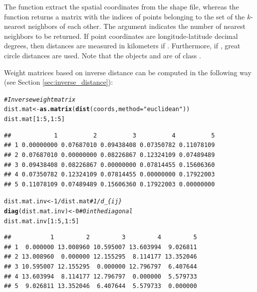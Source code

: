 \documentclass[english,12pt]{book}\usepackage[]{graphicx}\usepackage[]{xcolor}
\makeatletter
\newcommand{\hlnum}[1]{\textcolor[rgb]{0.686,0.059,0.569}{#1}}%
\newcommand{\hlstr}[1]{\textcolor[rgb]{0.192,0.494,0.8}{#1}}%
\newcommand{\hlcom}[1]{\textcolor[rgb]{0.678,0.584,0.686}{\textit{#1}}}%
\newcommand{\hlopt}[1]{\textcolor[rgb]{0,0,0}{#1}}%
\newcommand{\hlstd}[1]{\textcolor[rgb]{0.345,0.345,0.345}{#1}}%
\newcommand{\hlkwb}[1]{\textcolor[rgb]{0.69,0.353,0.396}{#1}}%
\newcommand{\hlkwc}[1]{\textcolor[rgb]{0.333,0.667,0.333}{#1}}%
\newcommand{\hlkwd}[1]{\textcolor[rgb]{0.737,0.353,0.396}{\textbf{#1}}}%
\newenvironment{kframe}{%
 \def\at@end@of@kframe{}%
 \ifinner\ifhmode%
  \def\at@end@of@kframe{\end{minipage}}%
  \begin{minipage}{\columnwidth}%
 \fi\fi%
 \def\FrameCommand##1{\hskip\@totalleftmargin \hskip-\fboxsep
 \colorbox{shadecolor}{##1}\hskip-\fboxsep
     \hskip-\linewidth \hskip-\@totalleftmargin \hskip\columnwidth}%
 \MakeFramed {\advance\hsize-\width
   \@totalleftmargin\z@ \linewidth\hsize
   \@setminipage}}%
 {\par\unskip\endMakeFramed%
 \at@end@of@kframe}
\newenvironment{knitrout}{}{} %
\makeatother
\begin{document}
The function  extract the spatial coordinates from the shape file, whereas the function  returns a matrix with the indices of points belonging to the set of the $k$-nearest neighbors of each other. The argument  indicates the number of nearest neighbors to be returned. If point coordinates are longitude-latitude decimal degrees, then distances are measured in kilometers if . Furthermore, if , great circle distances are used. Note that the objects  and  are of class .

Weight matrices based on inverse distance can be computed in the following way (see Section \ref{sec:inverse_distance}):

\begin{knitrout}
\color{fgcolor}\begin{kframe}
\begin{alltt}
\hlcom{# Inverse weight matrix}
\hlstd{dist.mat} \hlkwb{<-} \hlkwd{as.matrix}\hlstd{(}\hlkwd{dist}\hlstd{(coords,} \hlkwc{method} \hlstd{=} \hlstr{"euclidean"}\hlstd{))}
\hlstd{dist.mat[}\hlnum{1}\hlopt{:}\hlnum{5}\hlstd{,} \hlnum{1}\hlopt{:}\hlnum{5}\hlstd{]}
\end{alltt}
\begin{verbatim}
##            1          2          3          4          5
## 1 0.00000000 0.07687010 0.09438408 0.07350782 0.11078109
## 2 0.07687010 0.00000000 0.08226867 0.12324109 0.07489489
## 3 0.09438408 0.08226867 0.00000000 0.07814455 0.15606360
## 4 0.07350782 0.12324109 0.07814455 0.00000000 0.17922003
## 5 0.11078109 0.07489489 0.15606360 0.17922003 0.00000000
\end{verbatim}
\begin{alltt}
\hlstd{dist.mat.inv} \hlkwb{<-} \hlnum{1} \hlopt{/} \hlstd{dist.mat} \hlcom{# 1 / d_\{ij\}}
\hlkwd{diag}\hlstd{(dist.mat.inv)} \hlkwb{<-} \hlnum{0}      \hlcom{# 0 in the diagonal}
\hlstd{dist.mat.inv[}\hlnum{1}\hlopt{:}\hlnum{5}\hlstd{,} \hlnum{1}\hlopt{:}\hlnum{5}\hlstd{]}
\end{alltt}
\begin{verbatim}
##           1         2         3         4         5
## 1  0.000000 13.008960 10.595007 13.603994  9.026811
## 2 13.008960  0.000000 12.155295  8.114177 13.352046
## 3 10.595007 12.155295  0.000000 12.796797  6.407644
## 4 13.603994  8.114177 12.796797  0.000000  5.579733
## 5  9.026811 13.352046  6.407644  5.579733  0.000000
\end{verbatim}

\end{kframe}
\end{knitrout}
\end{document}
